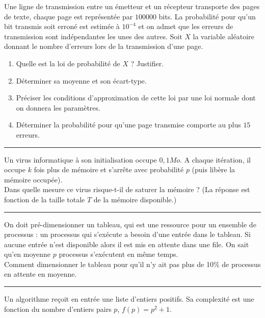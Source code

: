 \documentclass[../PolyS4.tex]{subfiles}
\begin{document}
Une ligne de transmission entre un émetteur et un récepteur transporte des pages de texte, chaque
page est représentée par $100 000$ bits. La probabilité pour qu'un bit transmis soit erroné est estimée
à $10^{-4}$ et on admet que les erreurs de transmission sont indépendantes les unes des autres. Soit $X$ la variable aléatoire donnant le nombre d'erreurs lors de la transmission d'une page.
\begin{enumerate}
\item Quelle est la loi de probabilité de $ X$ ? Justifier.
\item
 Déterminer sa moyenne et son écart-type.
\item	Préciser les conditions d'approximation de cette loi par une loi normale dont on donnera les paramètres.
\item	Déterminer la probabilité pour qu'une page transmise comporte au plus $15$ erreurs.\\
\end{enumerate}

\hfill\break
\hrule
\hfill\break


Un virus informatique à son initialisation occupe $0,1 Mo$. A chaque itération, il occupe $k$ fois plus de mémoire et s'arrête avec probabilité $p$ (puis libère la mémoire occupée).\\

 Dans quelle mesure ce virus risque-t-il de saturer la mémoire ? (La réponse est fonction de la taille totale $ T$ de la mémoire disponible.)\\

\hfill\break
\hrule
\hfill\break


On doit pré-dimensionner un tableau, qui est une ressource pour un ensemble de processus : un processus qui s'exécute a besoin d'une entrée dans le tableau. Si aucune entrée n'est disponible alors il est mis en attente dans une file. On sait qu'en moyenne $p$ processus s'exécutent en même temps.\\

 Comment dimensionner le tableau pour qu'il n'y ait pas plus de 10\% de processus en attente en moyenne.\\

\hfill\break
\hrule
\hfill\break



Un algorithme reçoit en entrée une liste d'entiers positifs. Sa complexité est une fonction du nombre d'entiers pairs $p$, $f(p) = p^2 + 1$.\\
\end{document}
